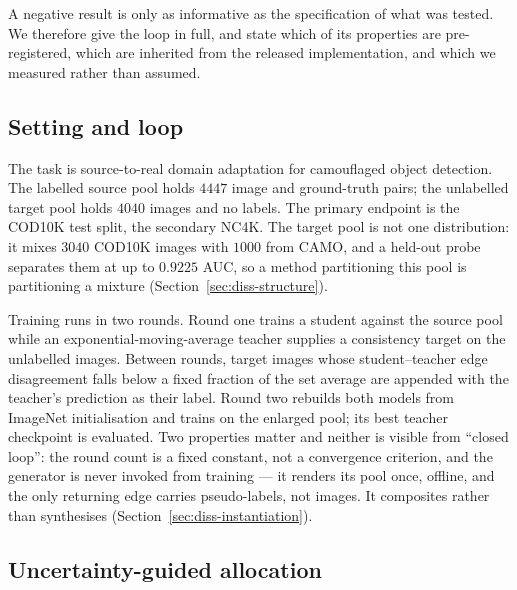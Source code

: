 \documentclass{article} %
\begin{document}
A negative result is only as informative as the specification of what was tested. We therefore give
the loop in full, and state which of its properties are pre-registered, which are inherited from the
released implementation, and which we measured rather than assumed.

\subsection{Setting and loop}
\label{sec:method-setting}

The task is source-to-real domain adaptation for camouflaged object detection. The labelled source
pool holds $4447$ image and ground-truth pairs; the unlabelled target pool holds $4040$ images and no
labels. The primary endpoint is the COD10K test split, the secondary NC4K. The target pool is not one
distribution: it mixes $3040$ COD10K images with $1000$ from CAMO, and a held-out probe separates them
at up to $0.9225$ AUC, so a method partitioning this pool is partitioning a mixture
(Section~\ref{sec:diss-structure}).

Training runs in two rounds. Round one trains a student against the source pool while an
exponential-moving-average teacher supplies a consistency target on the unlabelled images. Between
rounds, target images whose student--teacher edge disagreement falls below a fixed fraction of the set
average are appended with the teacher's prediction as their label. Round two rebuilds both models from
ImageNet initialisation and trains on the enlarged pool; its best teacher checkpoint is evaluated. Two
properties matter and neither is visible from ``closed loop'': the round count is a fixed constant,
not a convergence criterion, and the generator is never invoked from training --- it renders its pool
once, offline, and the only returning edge carries pseudo-labels, not images. It composites rather
than synthesises (Section~\ref{sec:diss-instantiation}).

\subsection{Uncertainty-guided allocation}
\label{sec:method-allocation}
\end{document}
